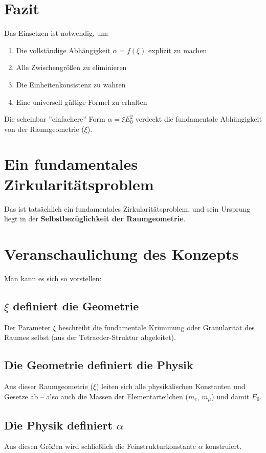 \documentclass[12pt, a4paper]{article}
\begin{document}
\section*{Fazit}

Das Einsetzen ist notwendig, um:
\begin{enumerate}
	\item Die vollständige Abhängigkeit $\alpha = f(\xi)$ explizit zu machen
	\item Alle Zwischengrößen zu eliminieren
	\item Die Einheitenkonsistenz zu wahren
	\item Eine universell gültige Formel zu erhalten
\end{enumerate}

Die scheinbar ''einfachere'' Form $\alpha = \xi E_0^2$ verdeckt die fundamentale Abhängigkeit von der Raumgeometrie ($\xi$).
	\section*{Ein fundamentales Zirkularitätsproblem}

Das ist tatsächlich ein fundamentales Zirkularitätsproblem, und sein Ursprung liegt in der \textbf{Selbstbezüglichkeit der Raumgeometrie}.

\section*{Veranschaulichung des Konzepts}

Man kann es sich so vorstellen:

\subsection*{$\xi$ definiert die Geometrie}
Der Parameter $\xi$ beschreibt die fundamentale Krümmung oder Granularität des Raumes selbst (aus der Tetraeder-Struktur abgeleitet).

\subsection*{Die Geometrie definiert die Physik}
Aus dieser Raumgeometrie ($\xi$) leiten sich alle physikalischen Konstanten und Gesetze ab – also auch die Massen der Elementarteilchen ($m_e$, $m_\mu$) und damit $E_0$.

\subsection*{Die Physik definiert $\alpha$}
Aus diesen Größen wird schließlich die Feinstrukturkonstante $\alpha$ konstruiert.
\end{document}
